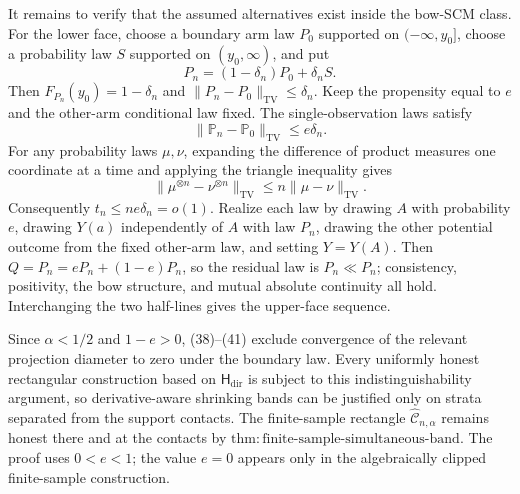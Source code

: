 It remains to verify that the assumed alternatives exist inside the bow-SCM class.  For the lower face, choose a boundary arm law \(P_0\) supported on \(({-}\infty,y_0]\), choose a probability law \(S\) supported on \((y_0,\infty)\), and put
\[
 P_n=(1-\delta_n)P_0+\delta_nS.
\]
Then \(F_{P_n}(y_0)=1-\delta_n\) and \(\|P_n-P_0\|_{\mathrm{TV}}\le\delta_n\).  Keep the propensity equal to \(e\) and the other-arm conditional law fixed.  The single-observation laws satisfy
\[
 \|\mathbb P_n-\mathbb P_0\|_{\mathrm{TV}}\le e\delta_n.
\]
For any probability laws \(\mu,\nu\), expanding the difference of product measures one coordinate at a time and applying the triangle inequality gives
\[
 \|\mu^{\otimes n}-\nu^{\otimes n}\|_{\mathrm{TV}}
 \le n\|\mu-\nu\|_{\mathrm{TV}}.
\]
Consequently \(t_n\le ne\delta_n=o(1)\).  Realize each law by drawing \(A\) with probability \(e\), drawing \(Y(a)\) independently of \(A\) with law \(P_n\), drawing the other potential outcome from the fixed other-arm law, and setting \(Y=Y(A)\).  Then \(Q=P_n=eP_n+(1-e)P_n\), so the residual law is \(P_n\ll P_n\); consistency, positivity, the bow structure, and mutual absolute continuity all hold.  Interchanging the two half-lines gives the upper-face sequence.

Since \(\alpha<1/2\) and \(1-e>0\), (38)--(41) exclude convergence of the relevant projection diameter to zero under the boundary law.  Every uniformly honest rectangular construction based on \(\mathsf H_{\mathrm{dir}}\) is subject to this indistinguishability argument, so derivative-aware shrinking bands can be justified only on strata separated from the support contacts.  The finite-sample rectangle \(\widehat{\mathcal C}_{n,\alpha}\) remains honest there and at the contacts by \(\mathrm{thm:finite\text{-}sample\text{-}simultaneous\text{-}band}\).  The proof uses \(0<e<1\); the value \(e=0\) appears only in the algebraically clipped finite-sample construction.